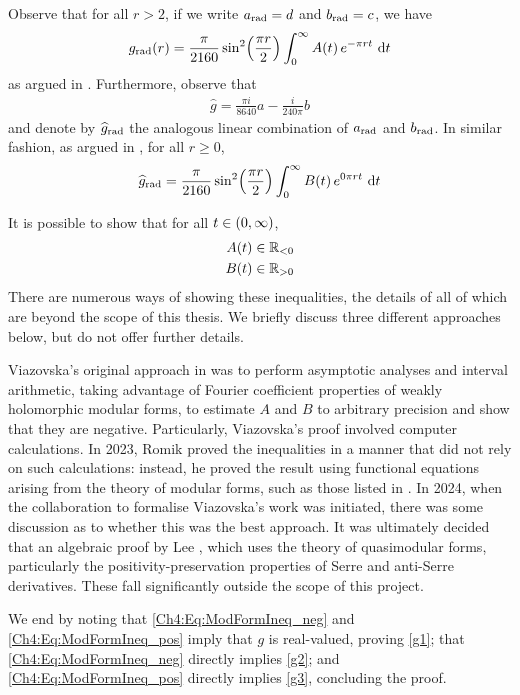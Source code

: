 Observe that for all $r > 2$, if we write $a_{\operatorname{rad}} = d$ and $b_{\operatorname{rad}} = c$, we have
\begin{align*}
    g_{\operatorname{rad}}(r) = \frac{\pi}{2160} \sin^2\!\left( \frac{\pi r}{2} \right) \int_{0}^{\infty} A(t) \, e^{- \pi r t} \, \operatorname{d}\!{t}
\end{align*}
as argued in . Furthermore, observe that
\begin{align}
    \hat{g} = \frac{\pi i}{8640} a - \frac{i}{240\pi} b
\end{align}
and denote by $\widehat{g}_{\operatorname{rad}}$ the analogous linear combination of $a_{\operatorname{rad}}$ and $b_{\operatorname{rad}}$. In similar fashion, as argued in , for all $r \geq 0$,
\begin{align}
    \widehat{g}_{\operatorname{rad}} = \frac{\pi}{2160} \sin^2\!\left( \frac{\pi r}{2} \right) \int_{0}^{\infty} B(t) \, e^{0\pi r t} \, \operatorname{d}\!{t}
\end{align}

It is possible to show that for all $t \in \left( 0, \infty \right)$,
\begin{align}
    A(t) &\in \mathbb{R}_{< 0} \label{Ch4:Eq:ModFormIneq_neg} \\
    B(t) &\in \mathbb{R}_{> 0} \label{Ch4:Eq:ModFormIneq_pos}
\end{align}
There are numerous ways of showing these inequalities, the details of all of which are beyond the scope of this thesis. We briefly discuss three different approaches below, but do not offer further details.

Viazovska's original approach in \cite{Viazovska8} was to perform asymptotic analyses and interval arithmetic, taking advantage of Fourier coefficient properties of weakly holomorphic modular forms, to estimate $A$ and $B$ to arbitrary precision and show that they are negative. Particularly, Viazovska's proof involved computer calculations. In 2023, Romik \cite{Romik_Ineq} proved the inequalities in a manner that did not rely on such calculations: instead, he proved the result using functional equations arising from the theory of modular forms, such as those listed in . In 2024, when the collaboration to formalise Viazovska's work was initiated, there was some discussion as to whether this was the best approach. It was ultimately decided that an algebraic proof by Lee \cite{Seewoo_Ineq}, which uses the theory of quasimodular forms, particularly the positivity-preservation properties of Serre and anti-Serre derivatives. These fall significantly outside the scope of this project.

We end by noting that \eqref{Ch4:Eq:ModFormIneq_neg} and \eqref{Ch4:Eq:ModFormIneq_pos} imply that $g$ is real-valued, proving \ref{g1}; that \eqref{Ch4:Eq:ModFormIneq_neg} directly implies \ref{g2}; and \eqref{Ch4:Eq:ModFormIneq_pos} directly implies \ref{g3}, concluding the proof.


